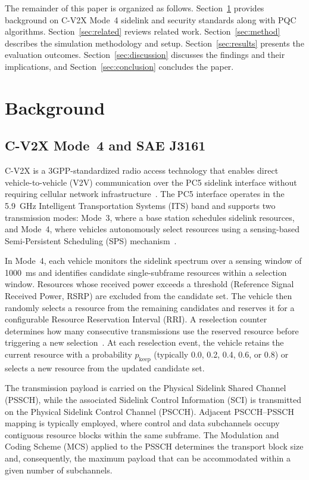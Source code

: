\documentclass[letterpaper,journal]{IEEEtran}
\begin{document}
The remainder of this paper is organized as follows. Section~\ref{sec:background} provides background on C-V2X Mode~4 sidelink and security standards along with PQC algorithms. Section~\ref{sec:related} reviews related work. Section~\ref{sec:method} describes the simulation methodology and setup. Section~\ref{sec:results} presents the evaluation outcomes. Section~\ref{sec:discussion} discusses the findings and their implications, and Section~\ref{sec:conclusion} concludes the paper.

\section{Background}
\label{sec:background}

\subsection{C-V2X Mode~4 and SAE J3161}
\label{sec:cv2x}

C-V2X is a 3GPP-standardized radio access technology that enables direct vehicle-to-vehicle (V2V) communication over the PC5 sidelink interface without requiring cellular network infrastructure~\cite{3gpp_36213}. The PC5 interface operates in the 5.9~GHz Intelligent Transportation Systems (ITS) band and supports two transmission modes: Mode~3, where a base station schedules sidelink resources, and Mode~4, where vehicles autonomously select resources using a sensing-based Semi-Persistent Scheduling (SPS) mechanism~\cite{molina2017lte}.

In Mode~4, each vehicle monitors the sidelink spectrum over a sensing window of 1000~ms and identifies candidate single-subframe resources within a selection window. Resources whose received power exceeds a threshold (Reference Signal Received Power, RSRP) are excluded from the candidate set. The vehicle then randomly selects a resource from the remaining candidates and reserves it for a configurable Resource Reservation Interval (RRI). A reselection counter determines how many consecutive transmissions use the reserved resource before triggering a new selection~\cite{3gpp_36321}. At each reselection event, the vehicle retains the current resource with a probability $p_\text{keep}$ (typically 0.0, 0.2, 0.4, 0.6, or 0.8) or selects a new resource from the updated candidate set.

The transmission payload is carried on the Physical Sidelink Shared Channel (PSSCH), while the associated Sidelink Control Information (SCI) is transmitted on the Physical Sidelink Control Channel (PSCCH). Adjacent PSCCH--PSSCH mapping is typically employed, where control and data subchannels occupy contiguous resource blocks within the same subframe. The Modulation and Coding Scheme (MCS) applied to the PSSCH determines the transport block size and, consequently, the maximum payload that can be accommodated within a given number of subchannels.
\end{document}

